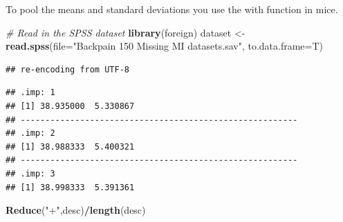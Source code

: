 \documentclass[]{book}
\newenvironment{Shaded}{\begin{snugshade}}{\end{snugshade}}
\newcommand{\KeywordTok}[1]{\textcolor[rgb]{0.13,0.29,0.53}{\textbf{#1}}}
\newcommand{\DataTypeTok}[1]{\textcolor[rgb]{0.13,0.29,0.53}{#1}}
\newcommand{\DecValTok}[1]{\textcolor[rgb]{0.00,0.00,0.81}{#1}}
\newcommand{\StringTok}[1]{\textcolor[rgb]{0.31,0.60,0.02}{#1}}
\newcommand{\CommentTok}[1]{\textcolor[rgb]{0.56,0.35,0.01}{\textit{#1}}}
\newcommand{\OtherTok}[1]{\textcolor[rgb]{0.56,0.35,0.01}{#1}}
\newcommand{\ControlFlowTok}[1]{\textcolor[rgb]{0.13,0.29,0.53}{\textbf{#1}}}
\newcommand{\OperatorTok}[1]{\textcolor[rgb]{0.81,0.36,0.00}{\textbf{#1}}}
\newcommand{\NormalTok}[1]{#1}
\theoremstyle{definition}
\theoremstyle{definition}
\theoremstyle{definition}
\theoremstyle{remark}
\begin{document}
To pool the means and standard deviations you use the with function in
mice.

\begin{Shaded}
\begin{Highlighting}[]
\CommentTok{# Read in the SPSS dataset}
\KeywordTok{library}\NormalTok{(foreign)}
\NormalTok{dataset <-}\StringTok{ }\KeywordTok{read.spss}\NormalTok{(}\DataTypeTok{file=}\StringTok{"Backpain 150 Missing MI datasets.sav"}\NormalTok{, }\DataTypeTok{to.data.frame=}\NormalTok{T)}
\end{Highlighting}
\end{Shaded}

\begin{verbatim}
## re-encoding from UTF-8
\end{verbatim}

\begin{Shaded}
\end{Shaded}

\begin{verbatim}
## .imp: 1
## [1] 38.935000  5.330867
## -------------------------------------------------------- 
## .imp: 2
## [1] 38.988333  5.400321
## -------------------------------------------------------- 
## .imp: 3
## [1] 38.998333  5.391361
\end{verbatim}

\begin{Shaded}
\begin{Highlighting}[]
\KeywordTok{Reduce}\NormalTok{(}\StringTok{"+"}\NormalTok{,desc)}\OperatorTok{/}\KeywordTok{length}\NormalTok{(desc)}
\end{Highlighting}
\end{Shaded}
\end{document}
